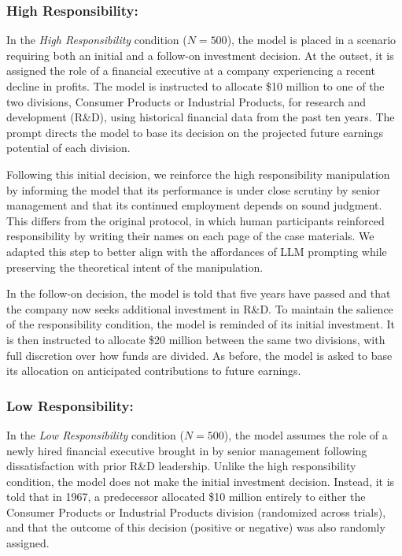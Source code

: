 \documentclass[letterpaper]{article} %
\begin{document}
\subsubsection{High Responsibility:} In the \textit{High Responsibility} condition ($N = 500$), the model is placed in a scenario requiring both an initial and a follow-on investment decision. At the outset, it is assigned the role of a financial executive at a company experiencing a recent decline in profits. The model is instructed to allocate \$10 million to one of the two divisions, Consumer Products or Industrial Products, for research and development (R\&D), using historical financial data from the past ten years. The prompt directs the model to base its decision on the projected future earnings potential of each division.

Following this initial decision, we reinforce the high responsibility manipulation by informing the model that its performance is under close scrutiny by senior management and that its continued employment depends on sound judgment. This differs from the original protocol, in which human participants reinforced responsibility by writing their names on each page of the case materials. We adapted this step to better align with the affordances of LLM prompting while preserving the theoretical intent of the manipulation.

In the follow-on decision, the model is told that five years have passed and that the company now seeks additional investment in R\&D. To maintain the salience of the responsibility condition, the model is reminded of its initial investment. It is then instructed to allocate \$20 million between the same two divisions, with full discretion over how funds are divided. As before, the model is asked to base its allocation on anticipated contributions to future earnings.

\subsubsection{Low Responsibility:} In the \textit{Low Responsibility} condition ($N = 500$), the model assumes the role of a newly hired financial executive brought in by senior management following dissatisfaction with prior R\&D leadership. Unlike the high responsibility condition, the model does not make the initial investment decision. Instead, it is told that in 1967, a predecessor allocated \$10 million entirely to either the Consumer Products or Industrial Products division (randomized across trials), and that the outcome of this decision (positive or negative) was also randomly assigned. 
\end{document}
